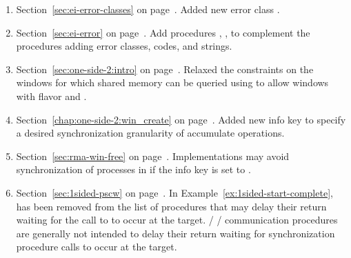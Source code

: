 \begin{enumerate}

\item
  Section~\ref{sec:ei-error-classes} on page~\pageref{sec:ei-error-classes}.
  \newline
  Added new error class
  .


\item
 Section~\ref{sec:ei-error} on page~\pageref{sec:ei-error}.
 \newline
 Add procedures , ,
  to complement the procedures adding error classes, codes, and strings.

\item
  Section~\ref{sec:one-side-2:intro} on page~\pageref{sec:one-side-2:intro}.
  \newline
  Relaxed the constraints on the windows for which shared memory can be queried using
   to allow windows with flavor 
  and .

\item
  Section~\ref{chap:one-side-2:win_create} on page~\pageref{chap:one-side-2:win_create}.
  \newline
  Added new info key  to specify a desired
  synchronization granularity of accumulate operations.


\item
  Section~\ref{sec:rma-win-free} on page~\pageref{sec:rma-win-free}.
  \newline
  Implementations may avoid synchronization of processes in 
  if the  info key is set to .

\item
  Section~\ref{sec:1sided-pscw} on page~\pageref{sec:1sided-pscw}.
  \newline
  In Example~\ref{ex:1sided-start-complete},  has been removed from the list
  of procedures that may delay their return waiting for the call to  to occur at the target.
  \MPI/ \RMA/ communication procedures are generally not intended to delay their return waiting for synchronization procedure calls
  to occur at the target.


\end{enumerate}
